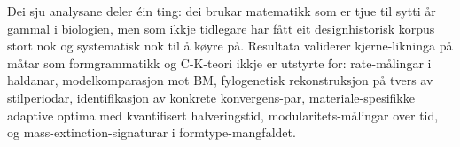 \documentclass[10pt,a4paper,twocolumn]{article}
\begin{document}
Dei sju analysane deler éin ting: dei brukar matematikk som er tjue til sytti år gammal i biologien, men som ikkje tidlegare har fått eit designhistorisk korpus stort nok og systematisk nok til å køyre på. Resultata validerer kjerne-likninga på måtar som formgrammatikk og C-K-teori ikkje er utstyrte for: rate-målingar i haldanar, modelkomparasjon mot BM, fylogenetisk rekonstruksjon på tvers av stilperiodar, identifikasjon av konkrete konvergens-par, materiale-spesifikke adaptive optima med kvantifisert halveringstid, modularitets-målingar over tid, og mass-extinction-signaturar i formtype-mangfaldet.


\end{document}
